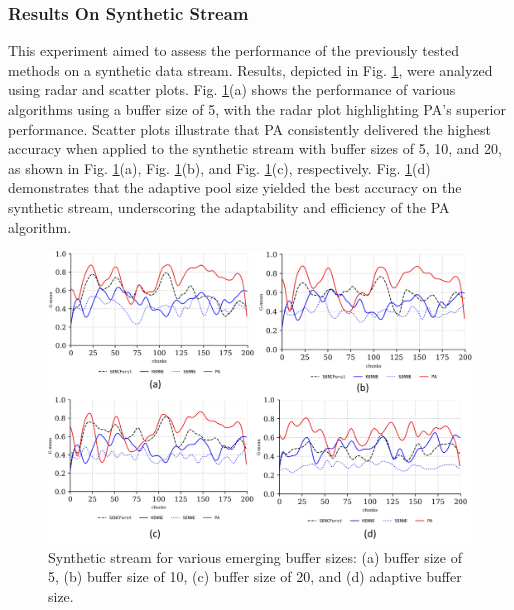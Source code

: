 \subsubsection{Results On Synthetic Stream}
\label{sec:synthetic}
This experiment aimed to assess the performance of the previously tested methods on a synthetic data stream. Results, depicted in Fig. \ref{fig:res3}, were analyzed using radar and scatter plots. Fig. \ref{fig:res3}(a) shows the performance of various algorithms using a buffer size of 5, with the radar plot highlighting PA's superior performance. Scatter plots illustrate that PA consistently delivered the highest accuracy when applied to the synthetic stream with buffer sizes of 5, 10, and 20, as shown in Fig. \ref{fig:res3}(a), Fig. \ref{fig:res3}(b), and Fig. \ref{fig:res3}(c), respectively. Fig. \ref{fig:res3}(d) demonstrates that the adaptive pool size yielded the best accuracy on the synthetic stream, underscoring the adaptability and efficiency of the PA algorithm.

\begin{figure}[!ht]
	\centering
	\includegraphics[width=1\linewidth]{5_Emerging/images/res3.png}
	\caption{Synthetic stream for various emerging buffer sizes: (a) buffer size of 5, (b) buffer size of 10, (c) buffer size of 20, and (d) adaptive buffer size.}

	\label{fig:res3}
\end{figure}				

